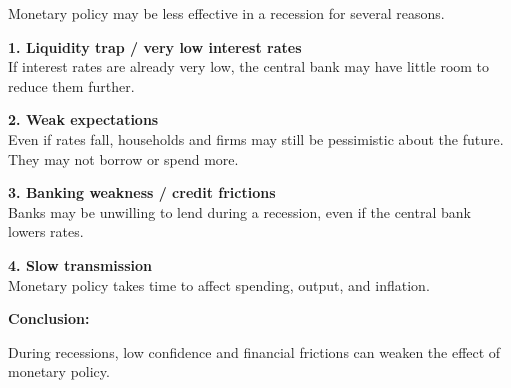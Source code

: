 \documentclass[12pt]{article}
\begin{document}
\begin{enumerate}[label=\textbf{\arabic*.}, start=10]
Monetary policy may be less effective in a recession for several reasons.

\textbf{1. Liquidity trap / very low interest rates}\\
If interest rates are already very low, the central bank may have little room to reduce them further.

\textbf{2. Weak expectations}\\
Even if rates fall, households and firms may still be pessimistic about the future. They may not borrow or spend more.

\textbf{3. Banking weakness / credit frictions}\\
Banks may be unwilling to lend during a recession, even if the central bank lowers rates.

\textbf{4. Slow transmission}\\
Monetary policy takes time to affect spending, output, and inflation.

\textbf{Conclusion:}

During recessions, low confidence and financial frictions can weaken the effect of monetary policy.


\end{enumerate}
\end{document}
